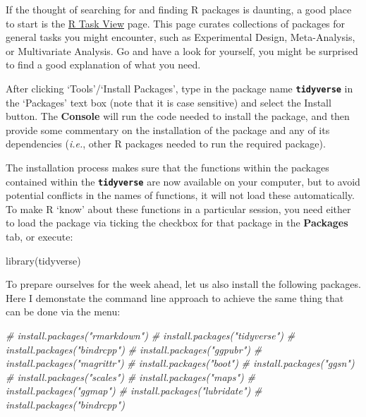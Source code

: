 \documentclass[
]{book}
\newenvironment{Shaded}{\begin{snugshade}}{\end{snugshade}}
\newcommand{\CommentTok}[1]{\textcolor[rgb]{0.56,0.35,0.01}{\textit{#1}}}
\newcommand{\FunctionTok}[1]{\textcolor[rgb]{0.00,0.00,0.00}{#1}}
\newcommand{\NormalTok}[1]{#1}
\begin{document}
If the thought of searching for and finding R packages is daunting, a good place to start is the \href{http://cran.r-project.org/web/views/}{R Task View} page. This page curates collections of packages for general tasks you might encounter, such as Experimental Design, Meta-Analysis, or Multivariate Analysis. Go and have a look for yourself, you might be surprised to find a good explanation of what you need.

After clicking `Tools'/`Install Packages', type in the package name \textbf{\texttt{tidyverse}} in the `Packages' text box (note that it is case sensitive) and select the Install button. The \textbf{Console} will run the code needed to install the package, and then provide some commentary on the installation of the package and any of its dependencies (\emph{i.e.}, other R packages needed to run the required package).

The installation process makes sure that the functions within the packages contained within the \textbf{\texttt{tidyverse}} are now available on your computer, but to avoid potential conflicts in the names of functions, it will not load these automatically. To make R `know' about these functions in a particular session, you need either to load the package via ticking the checkbox for that package in the \textbf{Packages} tab, or execute:

\begin{Shaded}
\begin{Highlighting}[]
\FunctionTok{library}\NormalTok{(tidyverse)}
\end{Highlighting}
\end{Shaded}

To prepare ourselves for the week ahead, let us also install the following packages. Here I demonstate the command line approach to achieve the same thing that can be done via the menu:

\begin{Shaded}
\begin{Highlighting}[]
\CommentTok{\# install.packages("rmarkdown")}
\CommentTok{\# install.packages("tidyverse")}
\CommentTok{\# install.packages("bindrcpp")}
\CommentTok{\# install.packages("ggpubr")}
\CommentTok{\# install.packages("magrittr")}
\CommentTok{\# install.packages("boot")}
\CommentTok{\# install.packages("ggsn")}
\CommentTok{\# install.packages("scales")}
\CommentTok{\# install.packages("maps")}
\CommentTok{\# install.packages("ggmap")}
\CommentTok{\# install.packages("lubridate")}
\CommentTok{\# install.packages("bindrcpp")}
\end{Highlighting}
\end{Shaded}
\end{document}

